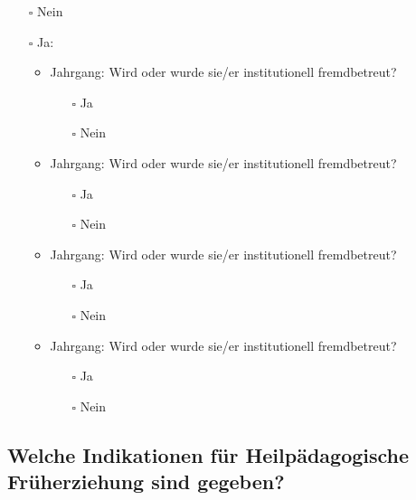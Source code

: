 \documentclass[
  ngerman,
  11pt,
  paper=a4,
  twoside,
  titlepage=true,
  openright,
  abstract=on,
  toc=listofnumbered,
  numbers=noenddot,
  chapterprefix=true,
  headings=optiontohead,
  svgnames,
  dvipsnames]{scrreprt}
\providecommand{\tightlist}{%
  \setlength{\itemsep}{0pt}\setlength{\parskip}{0pt}}
\begin{document}
\begin{itemize}
\item[$\square$]
  Nein
\item[$\square$]
  Ja:

  \begin{itemize}
  \item
    Jahrgang: \xhrule[,fill=2cm,thickness=0.5pt] Wird oder wurde sie/er
    institutionell fremdbetreut?

    \begin{itemize}
    \tightlist
    \item[$\square$]
      Ja
    \item[$\square$]
      Nein
    \end{itemize}
  \item
    Jahrgang: \xhrule[,fill=2cm,thickness=0.5pt] Wird oder wurde sie/er
    institutionell fremdbetreut?

    \begin{itemize}
    \tightlist
    \item[$\square$]
      Ja
    \item[$\square$]
      Nein
    \end{itemize}
  \item
    Jahrgang: \xhrule[,fill=2cm,thickness=0.5pt] Wird oder wurde sie/er
    institutionell fremdbetreut?

    \begin{itemize}
    \tightlist
    \item[$\square$]
      Ja
    \item[$\square$]
      Nein
    \end{itemize}
  \item
    Jahrgang: \xhrule[,fill=2cm,thickness=0.5pt] Wird oder wurde sie/er
    institutionell fremdbetreut?

    \begin{itemize}
    \tightlist
    \item[$\square$]
      Ja
    \item[$\square$]
      Nein
    \end{itemize}
  \end{itemize}
\end{itemize}

\hypertarget{welche-indikationen-fuxfcr-heilpuxe4dagogische-fruxfcherziehung-sind-gegeben}{%
\subsection*{Welche Indikationen für Heilpädagogische Früherziehung sind
gegeben?}\label{welche-indikationen-fuxfcr-heilpuxe4dagogische-fruxfcherziehung-sind-gegeben}}
\end{document}

